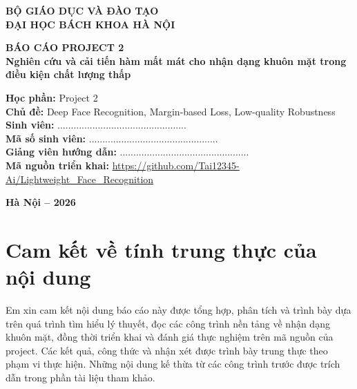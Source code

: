 \documentclass[13pt,a4paper]{extreport}
\newcommand{\projecttitle}{Nghiên cứu và cải tiến hàm mất mát cho nhận dạng khuôn mặt trong điều kiện chất lượng thấp}
\newcommand{\repo}{\url{https://github.com/Tai12345-Ai/Lightweight_Face_Recognition}}
\begin{document}
\begin{titlepage}
    \centering
    {\bfseries BỘ GIÁO DỤC VÀ ĐÀO TẠO\\}
    {\bfseries ĐẠI HỌC BÁCH KHOA HÀ NỘI\\}
    \vspace{1.5cm}

    {\Large\bfseries BÁO CÁO PROJECT 2\\}
    \vspace{0.8cm}
    {\Large\bfseries \projecttitle\\}
    \vspace{1.0cm}

    \begin{flushleft}
    \textbf{Học phần:} Project 2\\
    \textbf{Chủ đề:} Deep Face Recognition, Margin-based Loss, Low-quality Robustness\\
    \textbf{Sinh viên:} ................................................\\
    \textbf{Mã số sinh viên:} ................................................\\
    \textbf{Giảng viên hướng dẫn:} ................................................\\
    \textbf{Mã nguồn triển khai:} \repo
    \end{flushleft}

    \vfill
    {\bfseries Hà Nội -- 2026}
\end{titlepage}

\chapter*{Cam kết về tính trung thực của nội dung}
Em xin cam kết nội dung báo cáo này được tổng hợp, phân tích và trình bày dựa trên quá trình tìm hiểu lý thuyết, đọc các công trình nền tảng về nhận dạng khuôn mặt, đồng thời triển khai và đánh giá thực nghiệm trên mã nguồn của project. Các kết quả, công thức và nhận xét được trình bày trung thực theo phạm vi thực hiện. Những nội dung kế thừa từ các công trình trước được trích dẫn trong phần tài liệu tham khảo.

\newpage
\tableofcontents
\newpage
\listoftables
\newpage
\end{document}
